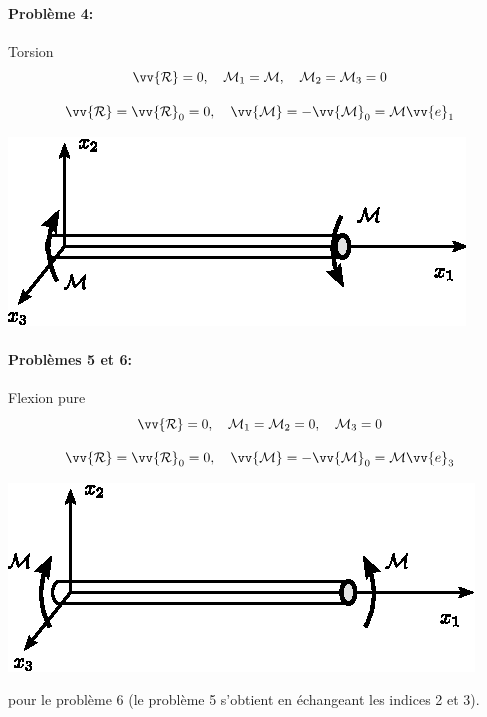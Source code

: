 \paragraph{Problème 4:} Torsion
\begin{equation}
    \vv{\mathcal{R}} = 0 , \quad \mathcal{M}_1 = \mathcal{M}, \quad \mathcal{M}_2 = \mathcal{M}_3 = 0
    \label{eq:Ch07-011}
\end{equation}
\begin{multicols}{2}
    \begin{equation*}
        \vv{\mathcal{R}} = \vv{\mathcal{R}}_0 = 0, \quad \vv{\mathcal{M}} = -\vv{\mathcal{M}}_0 = \mathcal{M} \vv{e}_1
    \end{equation*}
    \columnbreak
    \begin{center}
        \includegraphics{../images/T1_Ch07-04}
    \end{center}
\end{multicols}
\paragraph{Problèmes 5 et 6:} Flexion pure
\begin{equation}
    \vv{\mathcal{R}} = 0 , \quad \mathcal{M}_1 = \mathcal{M}_2 = 0, \quad \mathcal{M}_3 = 0
    \label{eq:Ch06-012}
\end{equation}
\begin{multicols}{2}
    \begin{equation*}
        \vv{\mathcal{R}} = \vv{\mathcal{R}}_0 = 0, \quad \vv{\mathcal{M}} = -\vv{\mathcal{M}}_0 = \mathcal{M} \vv{e}_3
    \end{equation*}
    \columnbreak
    \begin{center}
        \includegraphics{../images/T1_Ch07-05}
    \end{center}
\end{multicols}
pour le problème 6 (le problème 5 s'obtient en échangeant les indices 2 et 3).


